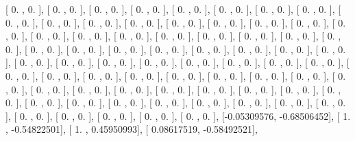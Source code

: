 \documentclass{article}
\begin{document}
       [ 0.        ,  0.        ],
       [ 0.        ,  0.        ],
       [ 0.        ,  0.        ],
       [ 0.        ,  0.        ],
       [ 0.        ,  0.        ],
       [ 0.        ,  0.        ],
       [ 0.        ,  0.        ],
       [ 0.        ,  0.        ],
       [ 0.        ,  0.        ],
       [ 0.        ,  0.        ],
       [ 0.        ,  0.        ],
       [ 0.        ,  0.        ],
       [ 0.        ,  0.        ],
       [ 0.        ,  0.        ],
       [ 0.        ,  0.        ],
       [ 0.        ,  0.        ],
       [ 0.        ,  0.        ],
       [ 0.        ,  0.        ],
       [ 0.        ,  0.        ],
       [ 0.        ,  0.        ],
       [ 0.        ,  0.        ],
       [ 0.        ,  0.        ],
       [ 0.        ,  0.        ],
       [ 0.        ,  0.        ],
       [ 0.        ,  0.        ],
       [ 0.        ,  0.        ],
       [ 0.        ,  0.        ],
       [ 0.        ,  0.        ],
       [ 0.        ,  0.        ],
       [ 0.        ,  0.        ],
       [ 0.        ,  0.        ],
       [ 0.        ,  0.        ],
       [ 0.        ,  0.        ],
       [ 0.        ,  0.        ],
       [ 0.        ,  0.        ],
       [ 0.        ,  0.        ],
       [ 0.        ,  0.        ],
       [ 0.        ,  0.        ],
       [ 0.        ,  0.        ],
       [ 0.        ,  0.        ],
       [ 0.        ,  0.        ],
       [ 0.        ,  0.        ],
       [ 0.        ,  0.        ],
       [ 0.        ,  0.        ],
       [ 0.        ,  0.        ],
       [ 0.        ,  0.        ],
       [ 0.        ,  0.        ],
       [ 0.        ,  0.        ],
       [ 0.        ,  0.        ],
       [ 0.        ,  0.        ],
       [ 0.        ,  0.        ],
       [ 0.        ,  0.        ],
       [ 0.        ,  0.        ],
       [ 0.        ,  0.        ],
       [ 0.        ,  0.        ],
       [ 0.        ,  0.        ],
       [ 0.        ,  0.        ],
       [ 0.        ,  0.        ],
       [ 0.        ,  0.        ],
       [ 0.        ,  0.        ],
       [ 0.        ,  0.        ],
       [ 0.        ,  0.        ],
       [ 0.        ,  0.        ],
       [ 0.        ,  0.        ],
       [ 0.        ,  0.        ],
       [ 0.        ,  0.        ],
       [ 0.        ,  0.        ],
       [ 0.        ,  0.        ],
       [ 0.        ,  0.        ],
       [ 0.        ,  0.        ],
       [ 0.        ,  0.        ],
       [-0.05309576, -0.68506452],
       [ 1.        , -0.54822501],
       [ 1.        ,  0.45950993],
       [ 0.08617519, -0.58492521],
\end{document}
